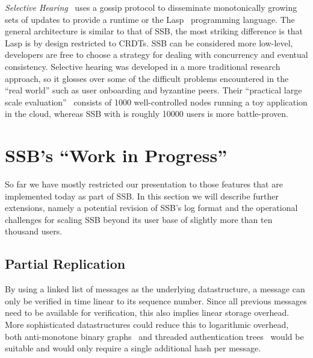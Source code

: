\documentclass[9pt,sigconf,rewiew]{acmart}
\begin{document}
\textit{Selective Hearing}~\cite{meiklejohn2015selective} uses a gossip protocol to disseminate monotonically growing sets of updates to provide a runtime or the Lasp~\cite{meiklejohn2015lasp} programming language. The general architecture is similar to that of SSB, the most striking difference is that Lasp is by design restricted to CRDTs. SSB can be considered more low-level, developers are free to choose a strategy for dealing with concurrency and eventual consistency. Selective hearing was developed in a more traditional research approach, so it glosses over some of the difficult problems encountered in the ``real world'' such as user onboarding and byzantine peers. Their ``practical large scale evaluation''~\cite{meiklejohn2017lasp} consists of 1000 well-controlled nodes running a toy application in the cloud, whereas SSB with is roughly 10000 users is more battle-proven.



\section{SSB's ``Work in Progress''}
\label{sec:wip}

So far we have mostly restricted our presentation to those features that are implemented today as part of SSB. In this section we will describe further extensions, namely a potential revision of SSB's log format and the operational challenges for scaling SSB beyond its user base of slightly more than ten thousand users.


\subsection{Partial Replication}

By using a linked list of messages as the underlying datastructure, a message can only be verified in time linear to its sequence number. Since all previous messages need to be available for verification, this also implies linear storage overhead. More sophisticated datastructures could reduce this to logarithmic overhead, both anti-monotone binary graphs~\cite{buldas1998new} and threaded authentication trees~\cite{buldas2000optimally} would be suitable and would only require a single additional hash per message.
\end{document}
